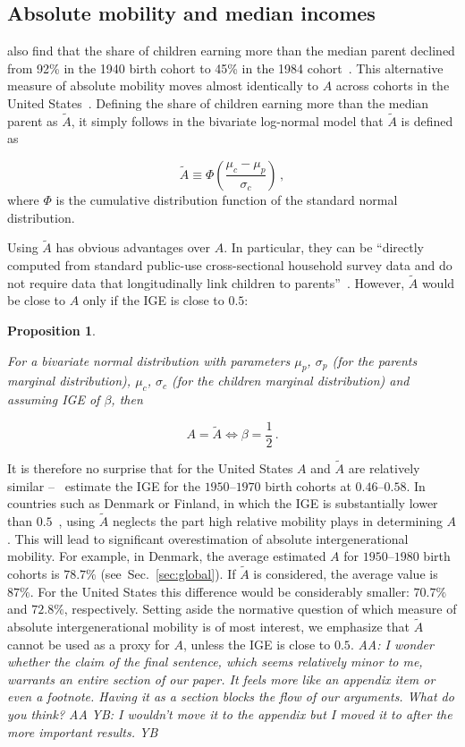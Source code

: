 \documentclass[12pt,a4paper]{article}
\newtheorem{proposition}{Proposition}
\newcommand{\red}[1]{{\color{red} #1}}
\newcommand{\blue}[1]{{\color{blue} #1}}
\newcommand{\elabel}[1]{\label{eq:#1}}
\newcommand{\sref}[1]{Sec.~\ref{sec:#1}}
\newcommand{\AAA}[1]{\red{{\it AA: #1 AA}}}
\newcommand{\YB}[1]{\blue{{\it YB: #1 YB}}}
\newcommand{\be}{\begin{equation}}
\newcommand{\ee}{\end{equation}}
\numberwithin{equation}{section}
\begin{document}
\subsection{Absolute mobility and median incomes}

\citet{chetty2017fading} also find that the share of children earning more than the median parent declined from 92\% in the 1940 birth cohort to 45\% in the 1984 cohort~\citep{katz2017documenting}. This alternative measure of absolute mobility moves almost identically to $A$ across cohorts in the United States~\citep{katz2017documenting}. Defining the share of children earning more than the median parent as $\tilde{A}$, it simply follows in the bivariate log-normal model that $\tilde{A}$ is defined as

\be
\tilde{A} \equiv \Phi\left(\frac{\mu_c-\mu_p}{\sigma_c} \right)\,,
\elabel{tildeA}
\ee
where $\Phi$ is the cumulative distribution function of the standard normal distribution.

Using $\tilde{A}$ has obvious advantages over $A$. In particular, they can be ``directly computed from standard public-use cross-sectional household survey data and do not require data that longitudinally link children to parents''~\citep[p.~382]{katz2017documenting}. However, $\tilde{A}$ would be close to $A$ only if the IGE is close to $0.5$:

\begin{proposition}
\label{prop:prop3}

For a bivariate normal distribution with parameters $\mu_p$, $\sigma_p$ (for the parents marginal distribution), $\mu_c$, $\sigma_c$ (for the children marginal distribution) and assuming IGE of $\beta$, then

\be
A=\tilde{A} \iff \beta=\frac{1}{2}\,.
\ee
\end{proposition}

It is therefore no surprise that for the United States $A$ and $\tilde{A}$ are relatively similar --~\citet{aaronson2008intergenerational} estimate the IGE for the $1950$--$1970$ birth cohorts at $0.46$--$0.58$. In countries such as Denmark or Finland, in which the IGE is substantially lower than $0.5$~\citep{corak2013income}, using $\tilde{A}$ neglects the part high relative mobility plays in determining $A$. This will lead to significant overestimation of absolute intergenerational mobility. For example, in Denmark, the average estimated $A$ for $1950$--$1980$ birth cohorts is $78.7\%$ (see~\sref{global}). If $\tilde{A}$ is considered, the average value is $87\%$. For the United States this difference would be considerably smaller: $70.7\%$ and $72.8\%$, respectively. Setting aside the normative question of which measure of absolute intergenerational mobility is of most interest, we emphasize that $\tilde{A}$ cannot be used as a proxy for $A$, unless the IGE is close to $0.5$. \AAA{I wonder whether the claim of the final sentence, which seems relatively minor to me, warrants an entire section of our paper. It feels more like an appendix item or even a footnote. Having it as a section blocks the flow of our arguments. What do you think?} \YB{I wouldn't move it to the appendix but I moved it to after the more important results.}
\end{document}
